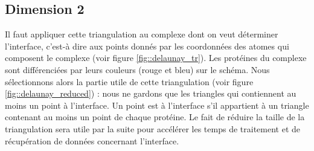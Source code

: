 \subsection*{Dimension 2}

Il faut appliquer cette triangulation au complexe dont on veut déterminer l'interface, c'est-à dire
aux points donnés par les coordonnées des atomes qui composent le complexe
(voir figure \ref{fig::delaunay_tr}). Les protéines du complexe sont différenciées
par leurs couleurs (rouge et bleu) sur le schéma. Nous sélectionnons alors la partie utile de
cette triangulation (voir figure \ref{fig::delaunay_reduced}) : nous ne gardons que
les triangles qui contiennent au moins un point à l'interface.
Un point est à l'interface s'il appartient à un triangle contenant au moins un point
de chaque protéine. Le fait de réduire la taille de la triangulation sera utile par la suite
pour accélérer les temps de traitement et de récupération de données concernant l'interface.



